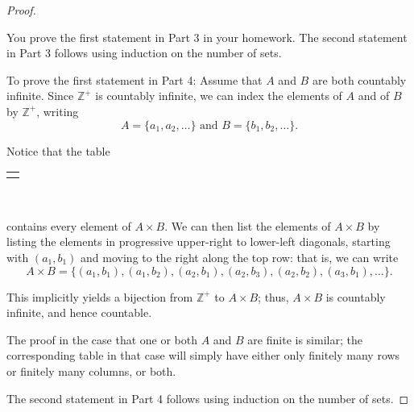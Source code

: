 \documentclass[10pt,]{book}
\theoremstyle{plain}
\theoremstyle{definition}
\theoremstyle{definition}
\theoremstyle{definition}
\theoremstyle{definition}
\numberwithin{equation}{section}
\newlength{\panelmax}
\def\Z{\mathbb{Z}}
\begin{document}
\begin{proof}\hypertarget{proof-4}{}
You prove the first statement in Part 3 in your homework. The second statement in Part 3 follows using induction on the number of sets.%
\par
To prove the first statement in Part 4: Assume that \(A\) and \(B\) are both countably infinite. Since \(\Z^+\) is countably infinite, we can index the elements of \(A\) and of \(B\) by \(\Z^+\), writing%
\begin{equation*}
A=\{a_1,a_2,\ldots\} \text{ and }  B=\{b_1,b_2,\ldots\}.
\end{equation*}
%
\par
Notice that the table%
{%
\setlength{\panelmax}{0pt}
\newsavebox{\panelboxBtabular}
\newlength{\phBtabular}\setlength{\phBtabular}{\ht\panelboxBtabular+\dp\panelboxBtabular}
\settototalheight{\phBtabular}{\usebox{\panelboxBtabular}}
\setlength{\panelmax}{\maxof{\panelmax}{\phBtabular}}
\leavevmode%
\setlength{\tabcolsep}{0\linewidth}
\par\medskip\noindent
\begin{tabular}{@{}*{1}{c}@{}}
\begin{minipage}[c][\panelmax][t]{1\linewidth}\usebox{\panelboxBtabular}\end{minipage}\end{tabular}\\
}%
\par
contains every element of \(A\times B\). We can then list the elements of \(A\times B\) by listing the elements in progressive upper-right to lower-left diagonals, starting with \((a_1,b_1)\) and moving to the right along the top row: that is, we can write%
\begin{equation*}
A\times B=\{(a_1,b_1),(a_1,b_2),(a_2,b_1),(a_2,b_3),(a_2,b_2),(a_3,b_1),\ldots\}.
\end{equation*}
%
\par
This implicitly yields a bijection from \(\Z^+\) to \(A\times B\); thus, \(A\times B\) is countably infinite, and hence countable.%
\par
The proof in the case that one or both \(A\) and \(B\) are finite is similar; the corresponding table in that case will simply have either only finitely many rows or finitely many columns, or both.%
\par
The second statement in Part 4 follows using induction on the number of sets.%
\end{proof}
\end{document}
